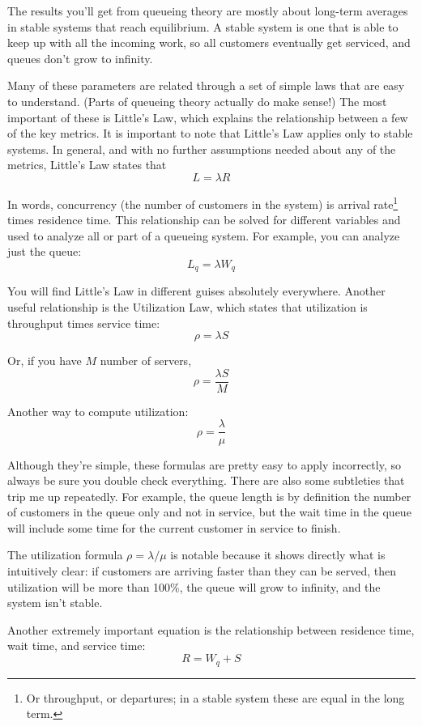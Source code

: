 \documentclass{vivid_layout}
\begin{document}
The results you'll get from queueing theory are mostly about long-term averages in stable systems that reach equilibrium. A stable system is one that is able to keep up with all the incoming work, so all customers eventually get serviced, and queues don't grow to infinity.

Many of these parameters are related through a set of simple laws that are easy to understand. (Parts of queueing theory actually do make sense!) The most important of these is Little's Law, which explains the relationship between a few of the key metrics. It is important to note that Little's Law applies only to stable systems. In general, and with no further assumptions needed about any of the metrics, Little's Law states that
\[
   L = \lambda R
\]

In words, concurrency (the number of customers in the system) is arrival rate\footnote{Or throughput, or departures; in a stable system these are equal in the long term.} times residence time. This relationship can be solved for different variables and used to analyze all or part of a queueing system. For example, you can analyze just the queue:
\[
  L_q = \lambda  W_q
\]

You will find Little's Law in different guises absolutely everywhere. Another useful relationship is the Utilization Law, which states that utilization is throughput times service time:
\[
 \rho = \lambda  S
\]

Or, if you have $M$ number of servers,
\[
 \rho = \frac{ \lambda S }{M}
\]

Another way to compute utilization:
\[
 \rho = \frac{\lambda}{ \mu}
\]

Although they're simple, these formulas are pretty easy to apply incorrectly, so always be sure you double check everything. There are also some subtleties that trip me up repeatedly. For example, the queue length is by definition the number of customers in the queue only and not in service, but the wait time in the queue will include some time for the current customer in service to finish.

The utilization formula \(\rho = \lambda / \mu\) is notable because it shows directly what is intuitively clear: if customers are arriving faster than they can be served, then utilization will be more than 100\%, the queue will grow to infinity, and the system isn't stable.

Another extremely important equation is the relationship between residence time, wait time, and  service time:
\[
 R = W_q + S
\]
\end{document}
